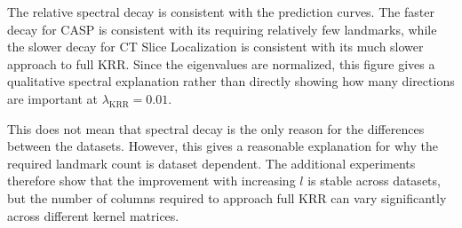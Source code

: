 The relative spectral decay is consistent with the prediction curves. The faster decay for CASP is consistent with its requiring relatively few landmarks, while the slower decay for CT Slice Localization is consistent with its much slower approach to full KRR. Since the eigenvalues are normalized, this figure gives a qualitative spectral explanation rather than directly showing how many directions are important at $\lambda_{\mathrm{KRR}}=0.01$.

This does not mean that spectral decay is the only reason for the differences between the datasets. However, this gives a reasonable explanation for why the required landmark count is dataset dependent. The additional experiments therefore show that the improvement with increasing $l$ is stable across datasets, but the number of columns required to approach full KRR can vary significantly across different kernel matrices.